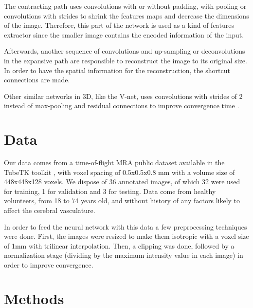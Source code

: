 \documentclass{article}
\begin{document}
The contracting path uses convolutions with or without padding, with pooling or convolutions with strides to shrink the features maps and decrease the dimensions of the image. Therefore, this part of the network is used as a kind of features extractor since the smaller image contains the encoded information of the input.

Afterwards, another sequence of convolutions and up-sampling or deconvolutions in the expansive path are responsible to reconstruct the image to its original size. In order to have the spatial information for the reconstruction, the shortcut connections are made.

Other similar networks in 3D, like the V-net, uses convolutions with strides of 2 instead of max-pooling and residual connections to improve convergence time \cite{Milletari2016}.




\section{Data}

Our data comes from a time-of-flight MRA public dataset available in the TubeTK toolkit \cite{Bullit}, with voxel spacing of 0.5x0.5x0.8 mm with a volume size of 448x448x128 voxels. We dispose of 36 annotated images, of which 32 were used for training, 1 for validation and 3 for testing. Data come from healthy volunteers, from 18 to 74 years old, and without history of any factors likely to affect the cerebral vasculature.

In order to feed the neural network with this data a few preprocessing techniques were done. First, the images were resized to make them isotropic with a voxel size of 1mm with trilinear interpolation. Then, a clipping was done, followed by a normalization stage (dividing by the maximum intensity value in each image) in order to improve convergence.

\section{Methods}

\end{document}
